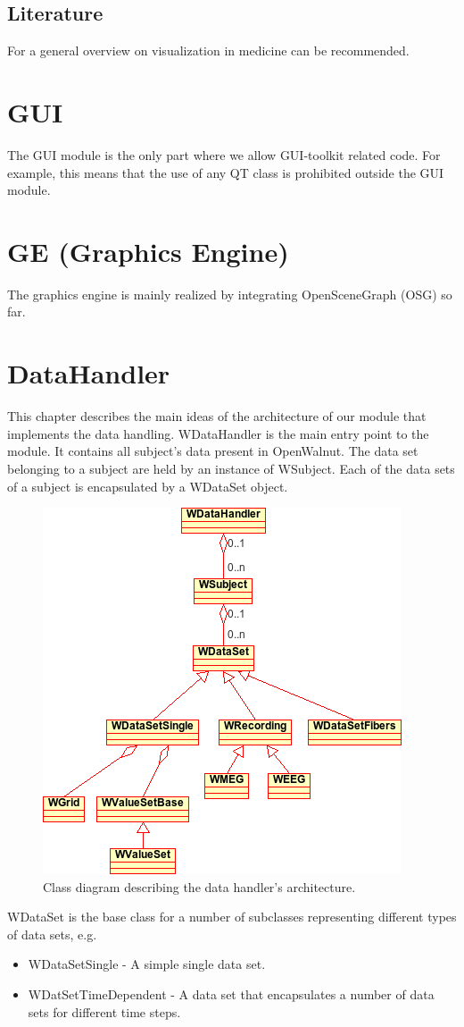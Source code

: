 \documentclass[a4paper,12pt]{scrbook}
\begin{document}
\section{Literature}
For a general overview on visualization in medicine \cite{Preim:2007:VMT} can be recommended.

\chapter{GUI}
The GUI module is the only part where we allow GUI-toolkit related code. For example, this means that the use of any QT class is
prohibited outside the GUI module.
\chapter{GE (Graphics Engine)}
The graphics engine is mainly realized by integrating OpenSceneGraph (OSG) so far.
\chapter{DataHandler}
This chapter describes the main ideas of the architecture of our module that implements the data handling. WDataHandler is the
main entry point to the module. It contains all subject's data present in OpenWalnut. The data set belonging to a subject are held by
an instance of WSubject. Each of the data sets of a subject is encapsulated by a WDataSet object. 

\begin{figure}[htb]
  \centering
  \includegraphics[width=.4\textwidth]{dataHandler_classDiagram}
  \caption{Class diagram describing the data handler's architecture.}
\end{figure}

WDataSet is the base class for a number of subclasses representing different types of data sets, e.g.
\begin{itemize}
\item WDataSetSingle - A simple single data set.
\item WDatSetTimeDependent - A data set that encapsulates a number of data sets for different time steps.
\end{itemize}
\end{document}
